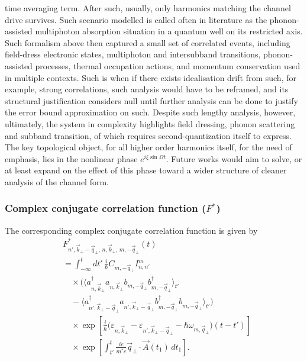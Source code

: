 \documentclass[%
 reprint,
 amsmath,amssymb,
 aps,
]{revtex4-2}
\begin{document}
time averaging term. After such, usually, only harmonics matching the channel drive survives. Such scenario modelled is called often in literature as the phonon-assisted multiphoton absorption situation in a quantum well on its restricted axis. Such formalism above then captured a small set of correlated events, including field-dress electronic states, multiphoton and intersubband transitions, phonon-assisted processes, thermal occupation actions, and momentum conservation used in multiple contexts. Such is when if there exists idealisation drift from such, for example, strong correlations, such analysis would have to be reframed, and its structural justification considers null until further analysis can be done to justify the error bound approximation on such. Despite such lengthy analysis, however, ultimately, the system in complexity highlights field dressing, phonon scattering and subband transition, of which requires second-quantization itself to express. The key topological object, for all higher order harmonics itself, for the need of emphasis, lies in the nonlinear phase $e^{i\xi \sin{\Omega}t}$. Future works would aim to solve, or at least expand on the effect of this phase toward a wider structure of cleaner analysis of the channel form. 

\subsubsection{Complex conjugate correlation function ($F^*$)}

The corresponding complex conjugate correlation function is given by
\begin{equation}
\begin{aligned}
&F_{n',\vec{k}_{\perp}-\vec{q}_{\perp},\,n,\vec{k}_{\perp},\,m,-\vec{q}_{\perp}}^{*}(t)\\
&=
\int_{-\infty}^{t}
dt'\,
\frac{i}{\hbar}
C_{m,-\vec{q}_{\perp}}
I_{n,n'}^{m}
\\
&\quad\times
\Big(
\langle
a_{n,\vec{k}_{\perp}}^{\dagger}
a_{n,\vec{k}_{\perp}}
b_{m,-\vec{q}_{\perp}}
b_{m,-\vec{q}_{\perp}}^{\dagger}
\rangle_{t'}
\\
&\quad
-
\langle
a_{n',\vec{k}_{\perp}-\vec{q}_{\perp}}^{\dagger}
a_{n',\vec{k}_{\perp}-\vec{q}_{\perp}}
b_{m,-\vec{q}_{\perp}}^{\dagger}
b_{m,-\vec{q}_{\perp}}
\rangle_{t'}
\Big)
\\
&\quad\times
\exp\left[
\frac{i}{\hbar}
\big(
\varepsilon_{n,\vec{k}_{\perp}}
-
\varepsilon_{n',\vec{k}_{\perp}-\vec{q}_{\perp}}
-
\hbar\omega_{m,\vec{q}_{\perp}}
\big)
(t-t')
\right]
\\
&\quad\times
\exp\left[
\int_{t'}^{t}
\frac{ie}{m^{*}c}
\vec{q}_{\perp}
\cdot
\vec{A}(t_{1})
\, dt_{1}
\right].
\end{aligned}
\end{equation}
\end{document}
